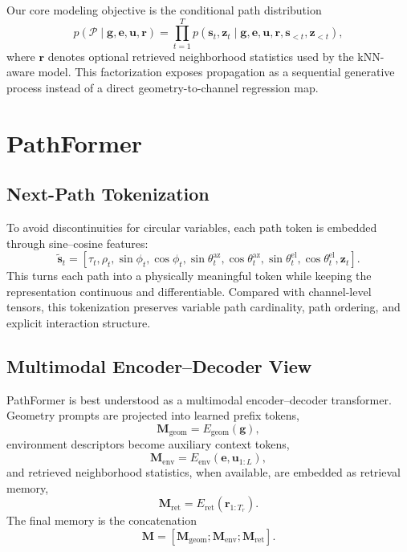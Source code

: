 \documentclass[11pt]{article}
\begin{document}
Our core modeling objective is the conditional path distribution
\begin{equation}
p(\mathcal{P}\mid \mathbf{g},\mathbf{e},\mathbf{u},\mathbf{r})

=
\prod_{t=1}^{T}
p(\mathbf{s}_t,\mathbf{z}_t \mid \mathbf{g},\mathbf{e},\mathbf{u},\mathbf{r},\mathbf{s}_{<t},\mathbf{z}_{<t}),
\label{eq:ar}
\end{equation}
where $\mathbf{r}$ denotes optional retrieved neighborhood statistics used by the kNN-aware model. This factorization exposes propagation as a sequential generative process instead of a direct geometry-to-channel regression map.

\section{PathFormer}
\subsection{Next-Path Tokenization}
To avoid discontinuities for circular variables, each path token is embedded through sine--cosine features:
\begin{equation}
\tilde{\mathbf{s}}_t =
[\tau_t,\rho_t,\sin\phi_t,\cos\phi_t,
\sin\theta_t^{\mathrm{az}},\cos\theta_t^{\mathrm{az}},
\sin\theta_t^{\mathrm{el}},\cos\theta_t^{\mathrm{el}},\mathbf{z}_t].
\end{equation}
This turns each path into a physically meaningful token while keeping the representation continuous and differentiable. Compared with channel-level tensors, this tokenization preserves variable path cardinality, path ordering, and explicit interaction structure.

\subsection{Multimodal Encoder--Decoder View}
PathFormer is best understood as a multimodal encoder--decoder transformer. Geometry prompts are projected into learned prefix tokens,
\begin{equation}
\mathbf{M}_{\mathrm{geom}} = E_{\mathrm{geom}}(\mathbf{g}),
\end{equation}
environment descriptors become auxiliary context tokens,
\begin{equation}
\mathbf{M}_{\mathrm{env}} = E_{\mathrm{env}}(\mathbf{e},\mathbf{u}_{1:L}),
\end{equation}
and retrieved neighborhood statistics, when available, are embedded as retrieval memory,
\begin{equation}
\mathbf{M}_{\mathrm{ret}} = E_{\mathrm{ret}}(\mathbf{r}_{1:T_r}).
\end{equation}
The final memory is the concatenation
\begin{equation}
\mathbf{M} = [\mathbf{M}_{\mathrm{geom}};\mathbf{M}_{\mathrm{env}};\mathbf{M}_{\mathrm{ret}}].
\end{equation}
\end{document}
